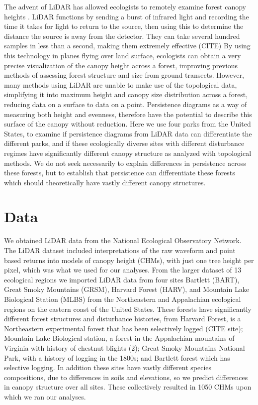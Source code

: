 \documentclass[10pt]{article}
\begin{document}
The advent of LiDAR has allowed ecologists to remotely examine forest canopy heights . LiDAR functions by sending a burst of infrared light and recording the time it takes for light to return to the source, then using this to determine the distance the source is away from the detector. They can take several hundred samples in less than a second, making them extremely effective (CITE) By using this technology in planes flying over land surface, ecologists can obtain a very precise visualization of the canopy height across a forest, improving previous methods of assessing forest structure and size from ground transects. However, many methods using LiDAR are unable to make use of the topological data, simplifying it into maximum height and canopy size distribution across a forest, reducing data on a surface to data on a point. Persistence diagrams as a way of measuring both height and evenness, therefore have the potential to describe this surface of the canopy without reduction. Here we use four parks from the United States, to examine if persistence diagrams from LiDAR data can differentiate the different parks, and if these ecologically diverse sites with different disturbance regimes have significantly different canopy structure as analyzed with topological methods. We do not seek necessarily to explain differences in persistence across these forests, but to establish that persistence can differentiate these forests which should theoretically have vastly different canopy structures.


\section*{Data}
	We obtained LiDAR data from the National Ecological Observatory Network. The LiDAR dataset included interpretations of the raw waveform and point based returns into models of canopy height (CHMs), with just one tree height per pixel, which was what we used for our analyses. From the larger dataset of 13 ecological regions we imported LiDAR data from four sites Bartlett (BART), Great Smoky Mountains (GRSM), Harvard Forest (HARV), and Mountain Lake Biological Station (MLBS) from the Northeastern and Appalachian ecological regions on the eastern coast of the United States. These forests have significantly different forest structures and disturbance histories, from Harvard Forest, is a Northeastern experimental forest that has been selectively logged (CITE site); Mountain Lake Biological station, a forest in the Appalachian mountains of Virginia with history of chestnut blights (2); Great Smoky Mountains National Park, with a history of logging in the 1800s; and Bartlett forest which has selective logging. In addition these sites have vastly different species compositions, due to differences in soils and elevations, so we predict differences in canopy structure over all sites. These collectively resulted in 1050 CHMs upon which we ran our analyses.
\end{document}
